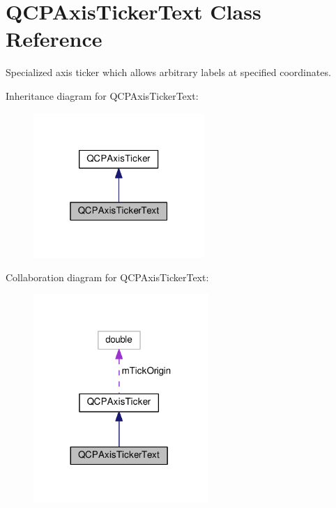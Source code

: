 \hypertarget{classQCPAxisTickerText}{}\section{Q\+C\+P\+Axis\+Ticker\+Text Class Reference}
\label{classQCPAxisTickerText}


Specialized axis ticker which allows arbitrary labels at specified coordinates.  




Inheritance diagram for Q\+C\+P\+Axis\+Ticker\+Text\+:
\nopagebreak
\begin{figure}[H]
\begin{center}
\leavevmode
\includegraphics[width=184pt]{classQCPAxisTickerText__inherit__graph}
\end{center}
\end{figure}


Collaboration diagram for Q\+C\+P\+Axis\+Ticker\+Text\+:
\nopagebreak
\begin{figure}[H]
\begin{center}
\leavevmode
\includegraphics[width=188pt]{classQCPAxisTickerText__coll__graph}
\end{center}
\end{figure}
